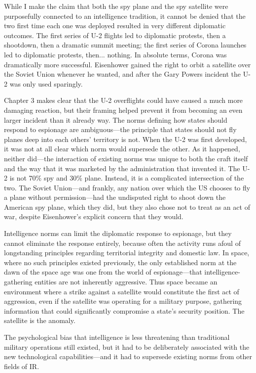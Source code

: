 \documentclass{report}
\begin{document}
While I make the claim that both the spy plane and the spy satellite were purposefully connected to an intelligence tradition, it cannot be denied that the two first time each one was deployed resulted in very different diplomatic outcomes. The first series of U-2 flights led to diplomatic protests, then a shootdown, then a dramatic summit meeting; the first series of Corona launches led to diplomatic protests, then... nothing. In absolute terms, Corona was dramatically more successful. Eisenhower gained the right to orbit a satellite over the Soviet Union whenever he wanted, and after the Gary Powers incident the U-2 was only used sparingly.

Chapter 3 makes clear that the U-2 overflights could have caused a much more damaging reaction, but their framing helped prevent it from becoming an even larger incident than it already way. The norms defining how states should respond to espionage are ambiguous---the principle that states should not fly planes deep into each others' territory is not. When the U-2 was first developed, it was not at all clear which norm would supersede the other. As it happened, neither did---the interaction of existing norms was unique to both the craft itself and the way that it was marketed by the administration that invented it. The U-2 is not 70\% spy and 30\% plane. Instead, it is a complicated intersection of the two. The Soviet Union---and frankly, any nation over which the US chooses to fly a plane without permission---had the undisputed right to shoot down the American spy plane, which they did, but they also chose not to treat as an act of war, despite Eisenhower's explicit concern that they would.

Intelligence norms can limit the diplomatic response to espionage, but they cannot eliminate the response entirely, because often the activity runs afoul of longstanding principles regarding territorial integrity and domestic law. In space, where no such principles existed previously, the only established norm at the dawn of the space age was one from the world of espionage---that intelligence-gathering entities are not inherently aggressive. Thus space became an environment where a strike against a satellite would constitute the first act of aggression, even if the satellite was operating for a military purpose, gathering information that could significantly compromise a state's security position. The satellite is the anomaly.


The psychological bias that intelligence is less threatening than traditional military operations still existed, but it had to be deliberately associated with the new technological capabilities---and it had to supersede existing norms from other fields of IR.
\end{document}
